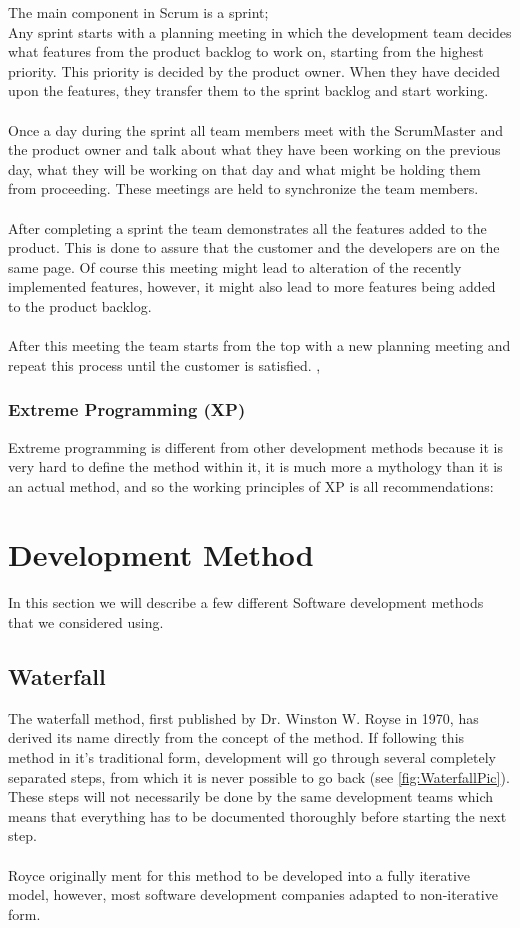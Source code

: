 The main component in Scrum is a sprint; \\
Any sprint starts with a planning meeting in which the development team decides what features from the product backlog to work on, starting from the highest priority. This priority is decided by the product owner. When they have decided upon the features, they transfer them to the sprint backlog and start working. \\
 \\
Once a day during the sprint all team members meet with the ScrumMaster and the product owner and talk about what they have been working on the previous day, what they will be working on that day and what might be holding them from proceeding. These meetings are held to synchronize the team members.\\
 \\
After completing a sprint the team demonstrates all the features added to the product. This is done to assure that the customer and the developers are on the same page. Of course this meeting might lead to alteration of the recently implemented features, however, it might also lead to more features being added to the product backlog.\\
 \\
After this meeting the team starts from the top with a new planning meeting and repeat this process until the customer is satisfied.
\cite{goat}, \cite{scrum}
\subsubsection{Extreme Programming (XP)}
Extreme programming is different from other development methods because it is very hard to define the method within it, it is much more a mythology than it is an actual method, and so the working principles of XP is all recommendations:
\section{Development Method}
\label{sec:DevelopmentMethods}
In this section we will describe a few different Software development methods that we considered using.

\subsection{Waterfall}
The waterfall method, first published by Dr. Winston W. Royse in 1970, has derived its name directly from the concept of the method. If following this method in it's traditional form, development will go through several completely separated steps, from which it is never possible to go back (see \ref{fig:WaterfallPic}). These steps will not necessarily be done by the same development teams which means that everything has to be documented thoroughly before starting the next step.\\
 \\
Royce originally ment for this method to be developed into a fully iterative model, however, most software development companies adapted to non-iterative form.
\cite{waterfallroyce}

